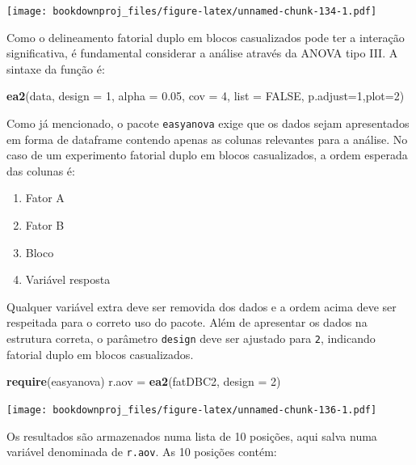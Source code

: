 \documentclass[
]{article}
\newenvironment{Shaded}{\begin{snugshade}}{\end{snugshade}}
\newcommand{\DataTypeTok}[1]{\textcolor[rgb]{0.13,0.29,0.53}{#1}}
\newcommand{\DecValTok}[1]{\textcolor[rgb]{0.00,0.00,0.81}{#1}}
\newcommand{\FloatTok}[1]{\textcolor[rgb]{0.00,0.00,0.81}{#1}}
\newcommand{\KeywordTok}[1]{\textcolor[rgb]{0.13,0.29,0.53}{\textbf{#1}}}
\newcommand{\NormalTok}[1]{#1}
\newcommand{\OtherTok}[1]{\textcolor[rgb]{0.56,0.35,0.01}{#1}}
\newcommand{\StringTok}[1]{\textcolor[rgb]{0.31,0.60,0.02}{#1}}
\providecommand{\tightlist}{%
  \setlength{\itemsep}{0pt}\setlength{\parskip}{0pt}}
\begin{document}
\texttt{[image: bookdownproj\_files/figure-latex/unnamed-chunk-134-1.pdf]}

Como o delineamento fatorial duplo em blocos casualizados pode ter a interação significativa, é fundamental considerar a análise através da ANOVA tipo III. A sintaxe da função é:

\begin{Shaded}
\begin{Highlighting}[]
\KeywordTok{ea2}\NormalTok{(data, }\DataTypeTok{design =} \DecValTok{1}\NormalTok{, }\DataTypeTok{alpha =} \FloatTok{0.05}\NormalTok{, }\DataTypeTok{cov =} \DecValTok{4}\NormalTok{, }\DataTypeTok{list =} \OtherTok{FALSE}\NormalTok{, }
    \DataTypeTok{p.adjust=}\DecValTok{1}\NormalTok{,}\DataTypeTok{plot=}\DecValTok{2}\NormalTok{)}
\end{Highlighting}
\end{Shaded}

Como já mencionado, o pacote \texttt{easyanova} exige que os dados sejam apresentados em forma de dataframe contendo apenas as colunas relevantes para a análise. No caso de um experimento fatorial duplo em blocos casualizados, a ordem esperada das colunas é:

\begin{enumerate}
\def\labelenumi{\arabic{enumi}.}
\tightlist
\item
  Fator A
\item
  Fator B
\item
  Bloco
\item
  Variável resposta
\end{enumerate}

Qualquer variável extra deve ser removida dos dados e a ordem acima deve ser respeitada para o correto uso do pacote. Além de apresentar os dados na estrutura correta, o parâmetro \texttt{design} deve ser ajustado para \texttt{2}, indicando fatorial duplo em blocos casualizados.

\begin{Shaded}
\begin{Highlighting}[]
\KeywordTok{require}\NormalTok{(easyanova)}
\NormalTok{r.aov =}\StringTok{ }\KeywordTok{ea2}\NormalTok{(fatDBC2, }\DataTypeTok{design =} \DecValTok{2}\NormalTok{)}
\end{Highlighting}
\end{Shaded}

\texttt{[image: bookdownproj\_files/figure-latex/unnamed-chunk-136-1.pdf]}

Os resultados são armazenados numa lista de 10 posições, aqui salva numa variável denominada de \texttt{r.aov}. As 10 posições contém:
\end{document}
